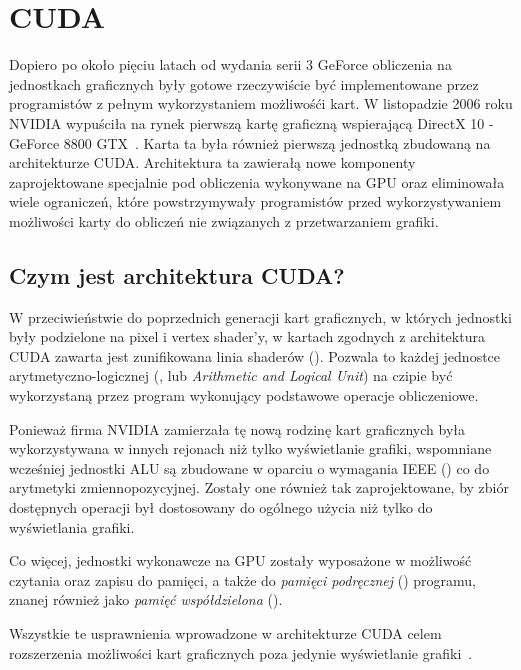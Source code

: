 \section{CUDA}

Dopiero po około pięciu latach od wydania serii 3 GeForce obliczenia na jednostkach graficznych były gotowe rzeczywiście być implementowane przez programistów z pełnym wykorzystaniem możliwośći kart. W listopadzie 2006 roku NVIDIA wypuściła na rynek pierwszą kartę graficzną wspierającą DirectX 10 - GeForce 8800 GTX~\cite{nvidia:geforce8800}. Karta ta była również pierwszą jednostką zbudowaną na architekturze CUDA. Architektura ta zawierałą nowe komponenty zaprojektowane specjalnie pod obliczenia wykonywane na GPU oraz eliminowała wiele ograniczeń, które powstrzymywały programistów przed wykorzystywaniem możliwości karty do obliczeń nie związanych z przetwarzaniem grafiki.

\subsection{Czym jest architektura CUDA?}

W przeciwieństwie do poprzednich generacji kart graficznych, w których jednostki były podzielone na pixel i vertex shader'y, w kartach zgodnych z architektura CUDA zawarta jest zunifikowana linia shaderów (). Pozwala to każdej jednostce arytmetyczno-logicznej (,  lub \emph{Arithmetic and Logical Unit}) na czipie być wykorzystaną przez program wykonujący podstawowe operacje obliczeniowe.

Ponieważ firma NVIDIA zamierzała tę nową rodzinę kart graficznych była wykorzystywana w innych rejonach niż tylko wyświetlanie grafiki, wspomniane wcześniej jednostki ALU są zbudowane w oparciu o wymagania IEEE () co do arytmetyki zmiennopozycyjnej. Zostały one również tak zaprojektowane, by zbiór dostępnych operacji był dostosowany do ogólnego użycia niż tylko do wyświetlania grafiki. 

Co więcej, jednostki wykonawcze na GPU zostały wyposażone w możliwość czytania oraz zapisu do pamięci, a także do \emph{pamięci podręcznej} () programu, znanej również jako \emph{pamięć współdzielona} ().

Wszystkie te usprawnienia wprowadzone w architekturze CUDA celem rozszerzenia możliwości kart graficznych poza jedynie wyświetlanie grafiki~\cite{Cuda:Example}.

